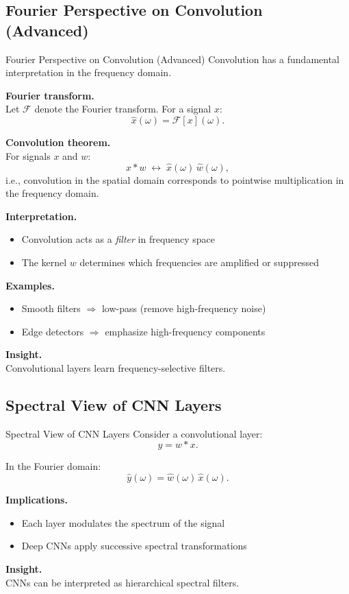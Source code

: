 \documentclass[aspectratio=169,11pt]{beamer}
\begin{document}
\subsection{Fourier Perspective on Convolution (Advanced)}
\begin{frame}[t,allowframebreaks]{Fourier Perspective on Convolution (Advanced)}
\small
Convolution has a fundamental interpretation in the frequency domain.

\textbf{Fourier transform.}\\ Let $\mathcal{F}$ denote the Fourier transform. For a signal $x$:
\[
\hat{x}(\omega) = \mathcal{F}[x](\omega).
\]

\textbf{Convolution theorem.}\\ For signals $x$ and $w$:
\[
x * w \;\longleftrightarrow\; \hat{x}(\omega)\,\hat{w}(\omega),
\]
i.e., convolution in the spatial domain corresponds to pointwise multiplication in the frequency domain.

\textbf{Interpretation.}\\ \begin{itemize}
    \item Convolution acts as a \emph{filter} in frequency space
    \item The kernel $w$ determines which frequencies are amplified or suppressed
\end{itemize}

\textbf{Examples.}\\ \begin{itemize}
    \item Smooth filters $\Rightarrow$ low-pass (remove high-frequency noise)
    \item Edge detectors $\Rightarrow$ emphasize high-frequency components
\end{itemize}

\textbf{Insight.}\\ Convolutional layers learn frequency-selective filters.
\end{frame}

\subsection{Spectral View of CNN Layers}
\begin{frame}[t,allowframebreaks]{Spectral View of CNN Layers}
\small
Consider a convolutional layer:
\[
y = w * x.
\]

In the Fourier domain:
\[
\hat{y}(\omega) = \hat{w}(\omega)\,\hat{x}(\omega).
\]

\textbf{Implications.}\\ \begin{itemize}
    \item Each layer modulates the spectrum of the signal
    \item Deep CNNs apply successive spectral transformations
\end{itemize}

\textbf{Insight.}\\ CNNs can be interpreted as hierarchical spectral filters.
\end{frame}
\end{document}
